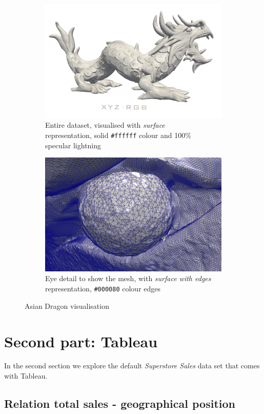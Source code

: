 \documentclass[openany]{article}
\begin{document}
\begin{figure}[h]
\centering
\begin{subfigure}{.5\textwidth}
  \centering
  \includegraphics[width=\linewidth]{Asian_Dragon/asian_dragon}
  \caption{Entire dataset, visualised with \textit{surface}  \\
  representation, solid \texttt{\#ffffff} colour and 100\% \\ specular lightning}
\end{subfigure}%
\begin{subfigure}{.5\textwidth}
  \centering
  \includegraphics[width=\linewidth]{Asian_Dragon/eye_detail_edges}
  \caption{Eye detail to show the mesh, with \textit{surface with edges} representation, \texttt{\#000080} colour edges}
\end{subfigure}
\caption{Asian Dragon visualisation}
\end{figure}

\newpage
\section {Second part: Tableau}

In the second section we explore the default \textit{Superstore Sales} data set that comes with Tableau.

\subsection {Relation total sales - geographical position}
\end{document}
